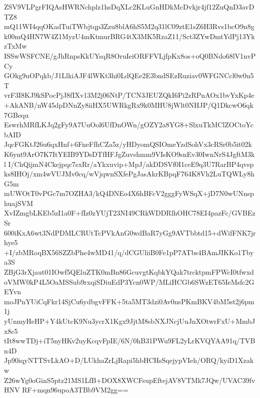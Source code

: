 ZSV9VLPgrFIQAsHWRNchplz1hsDqXLc2KLuGnHDkMcDvkjr4jf12ZuQnD3avDTZ8
mQ11WI4qqOKadTuiTWbjtqp3Zzu8blA6hS5M2q31lC09ztE1sZ6H3Rvs1bcO9n8g
k00mQ4HN7W4Z1MyzU4mKtmurBRG4tX3MK5RzaZ11/Sct3ZYwDmtYdPj13YkzTxMw
ISSwWSFCNE/gJhRnpsKkUYsqR8OruIeiORFFVLjfpKx8os+oQ0BNdo68lV1nvPCy
GOkg9uOPqkb/J1LlkiAJF4lWKt3hi0LdQEe2E3bndSEzRuziav0WFGNCcl0w0u5T
vrF3I8KJ9kSPocPjJ8fIXv13M2j06NtP/TCN3JEUZQkI6Pi2zRPnAOx1bvYxKp4e
+AkANB/nW45dpDNnZy8iiHX5UWRkgRx9k0MHU8jWlt0NHJP/Q1DkcwO6qk7GBequ
EswrhMRfLKJq2gFy9A7UuOol6UfDnOWn/gOZY2a8YG8+SlxuTkMClZOCtoYcbAID
JqcFGKtJ26u6qxHnf+6FneFfhCZa5z/yHDyomQSIOmeYzdSohVx3cRSr0b5it02k
K6ynt9ArO7K7ItYEIB9YDsDTfHFJgZuvshmm9VIsKO9snEv30IwnNrS4JgftM3kl
I/ChQijmN4Ckejpqc7sxRr/aYkxuvip+MpJ/akDDSVf0I1ceE9q3U7RarBP4qvsp
ks8IHOj/xm4wVUJMv0cq/wVjqwnSXfePgJasAkrKBpqF764K8Vh2LuTQWLy8hG5m
mUWOtT0vPGc7m7OZHA3/kQ4DNEo4X6hBFcV2gggFyWSqX+jD7N0wUNnsphuajSVM
XvIZmgbLKEb5zI1a0F+fIz0zYUjT23NI49CRkWDDRlhOHC78EI4pazFc/GVBEzSr
600iKxA6wt3NdPDMLCRUtTcPVkAnG0wdBaR7yGg9AVTbbtd15+dWifFNK7jrhye5
+I/zbMRoqBX56SZZbPhe4wMD41/q/dCGUliiB0Fe1pP7ATbs4BAmJIKKo1Tbya3S
ZBjG3rXjaut01IOwf5QEluZTK0mBn86GcuvgtKqbkYQak7trcktpmFPWcI0tfwxd
oVMW0kP4L5OaMSSub9rxqiSDiuEdP3Ycn0WP/MLiHCGb6SWzET65IeMsfc2GEYvn
moJPnYUiCqFkr14SjCu6ydbgvFFK+5ta5MT3dzi0Av0nsPKmBKV4bM5st2j6pm1j
yUnmyHeHP+Y4kUtcK9Nu3ycrX1Kgx9JjtM8sbNXJNcjUuJnXOtwrFxU+MmbJx8c5
tIt8wwTDj+iT5nyHKv2uyKcqvFpIE/6N/0hB31PWu9FL2yLrKVQYAA91q/TVBn4D
Jp90iqyNTTSvLkAO+D/LUkhaZrLjRapi5hbHCHsSqejypVIeh/ORQ/kyiD1Xzakw
Z26wYg0oGinS5ptz21MS1LfB+DOX8XWCFsupEftejAV8VTMk7JQw/UVAC39fvHNV
RF+mqn96upoA3TBb9VM2gg==
